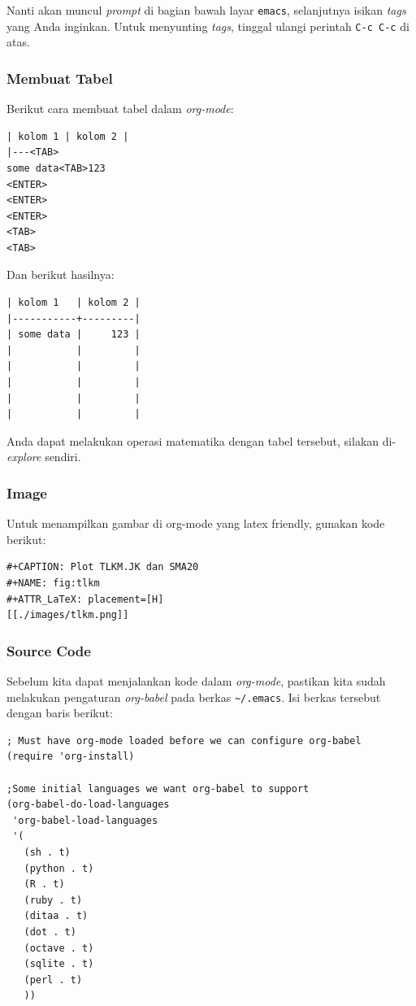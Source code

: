 \documentclass{article}
\begin{document}
Nanti akan muncul \emph{prompt} di bagian bawah layar \verb=emacs=, selanjutnya
isikan \emph{tags} yang Anda inginkan. Untuk menyunting \emph{tags}, tinggal 
ulangi perintah \verb=C-c C-c= di atas.

\subsubsection{Membuat Tabel}

Berikut cara membuat tabel dalam \emph{org-mode}:

\begin{verbatim}
| kolom 1 | kolom 2 |
|---<TAB>
some data<TAB>123
<ENTER>
<ENTER>
<ENTER>
<TAB>
<TAB>
\end{verbatim}

Dan berikut hasilnya:

\begin{verbatim}
| kolom 1   | kolom 2 |
|-----------+---------|
| some data |     123 |
|           |         |
|           |         |
|           |         |
|           |         |
|           |         |
\end{verbatim}

Anda dapat melakukan operasi matematika dengan tabel tersebut, silakan
di-\emph{explore} sendiri.

\subsubsection{Image}
Untuk menampilkan gambar di org-mode yang latex friendly, gunakan kode berikut:

\begin{verbatim}
#+CAPTION: Plot TLKM.JK dan SMA20
#+NAME: fig:tlkm
#+ATTR_LaTeX: placement=[H]
[[./images/tlkm.png]]
\end{verbatim}

\subsubsection{Source Code}
Sebelum kita dapat menjalankan kode dalam \emph{org-mode}, pastikan kita
sudah melakukan pengaturan \emph{org-babel} pada berkas \verb=~/.emacs=.
Isi berkas tersebut dengan baris berikut:

\begin{verbatim}
; Must have org-mode loaded before we can configure org-babel
(require 'org-install)

;Some initial languages we want org-babel to support
(org-babel-do-load-languages
 'org-babel-load-languages
 '(
   (sh . t)
   (python . t)
   (R . t)
   (ruby . t)
   (ditaa . t)
   (dot . t)
   (octave . t)
   (sqlite . t)
   (perl . t)
   ))
\end{verbatim}
\end{document}
